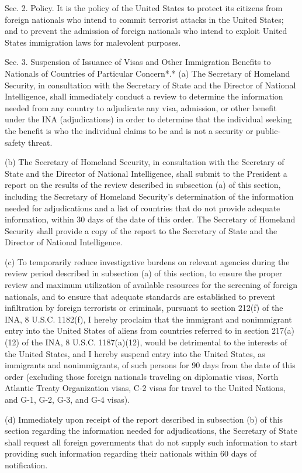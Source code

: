 Sec. 2. Policy. It is the policy of the United States to protect its
citizens from foreign nationals who intend to commit terrorist attacks
in the United States; and to prevent the admission of foreign nationals
who intend to exploit United States immigration laws for malevolent
purposes.

Sec. 3. Suspension of Issuance of Visas and Other Immigration Benefits
to Nationals of Countries of Particular Concern*.* (a) The Secretary of
Homeland Security, in consultation with the Secretary of State and the
Director of National Intelligence, shall immediately conduct a review to
determine the information needed from any country to adjudicate any
visa, admission, or other benefit under the INA (adjudications) in order
to determine that the individual seeking the benefit is who the
individual claims to be and is not a security or public-safety threat.

(b) The Secretary of Homeland Security, in consultation with the
Secretary of State and the Director of National Intelligence, shall
submit to the President a report on the results of the review described
in subsection (a) of this section, including the Secretary of Homeland
Security's determination of the information needed for adjudications and
a list of countries that do not provide adequate information, within 30
days of the date of this order. The Secretary of Homeland Security shall
provide a copy of the report to the Secretary of State and the Director
of National Intelligence.

(c) To temporarily reduce investigative burdens on relevant agencies
during the review period described in subsection (a) of this section, to
ensure the proper review and maximum utilization of available resources
for the screening of foreign nationals, and to ensure that adequate
standards are established to prevent infiltration by foreign terrorists
or criminals, pursuant to section 212(f) of the INA, 8 U.S.C. 1182(f), I
hereby proclaim that the immigrant and nonimmigrant entry into the
United States of aliens from countries referred to in section 217(a)(12)
of the INA, 8 U.S.C. 1187(a)(12), would be detrimental to the interests
of the United States, and I hereby suspend entry into the United States,
as immigrants and nonimmigrants, of such persons for 90 days from the
date of this order (excluding those foreign nationals traveling on
diplomatic visas, North Atlantic Treaty Organization visas, C-2 visas
for travel to the United Nations, and G-1, G-2, G-3, and G-4 visas).

(d) Immediately upon receipt of the report described in subsection (b)
of this section regarding the information needed for adjudications, the
Secretary of State shall request all foreign governments that do not
supply such information to start providing such information regarding
their nationals within 60 days of notification.


